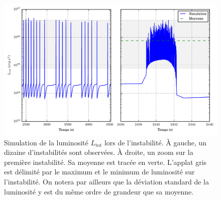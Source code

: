 \begin{figure}
  
  \includegraphics{figures/Ltot_fonction_t_doublecheeseburger.pdf}
  \caption{Simulation de la luminosité $L_\mathrm{tot}$ lors de l'instabilité. À gauche, un dizaine d'instabilités sont observées. À droite, un zoom sur la première instabilité. Sa moyenne est tracée en verte. L'applat gris est délimité par le maximum et le minimum de luminosité sur l'instabilité. On notera par ailleurs que la déviation standard de la luminosité y est du même ordre de grandeur que sa moyenne.}
  \label{fig:Ltot_instabilite}
\end{figure}
